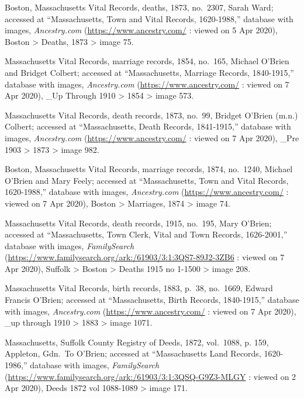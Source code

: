 \begin{thebibliography}{99}
	Boston, Massachusetts Vital Records, deaths, 1873, no.\ 2307, Sarah Ward; accessed at ``Massachusetts, Town and Vital Records, 1620-1988,'' database with images, \textit{Ancestry.com} (\url{https://www.ancestry.com/} : viewed on 5 Apr 2020), Boston > Deaths, 1873 > image 75.
	
	Massachusetts Vital Records, marriage records, 1854, no.\ 165, Michael O'Brien and Bridget Colbert; accessed at ``Massachusetts, Marriage Records, 1840-1915,'' database with images, \textit{Ancestry.com} (\url{https://www.ancestry.com/} : viewed on 7 Apr 2020), \_Up Through 1910 > 1854 > image 573.
	
	Massachusetts Vital Records, death records, 1873, no.\ 99, Bridget O'Brien (m.n.) Colbert; accessed at ``Massachusetts, Death Records, 1841-1915,'' database with images, \textit{Ancestry.com} (\url{https://www.ancestry.com/} : viewed on 7 Apr 2020), \_Pre 1903 > 1873 > image 982.
	
	Boston, Massachusetts Vital Records, marriage records, 1874, no.\ 1240, Michael O'Brien and Mary Feely; accessed at ``Massachusetts, Town and Vital Records, 1620-1988,'' database with images, \textit{Ancestry.com} (\url{https://www.ancestry.com/} : viewed on 7 Apr 2020), Boston > Marriages, 1874 > image 74.
	
	Massachusetts Vital Records, death records, 1915, no.\ 195, Mary O'Brien; accessed at ``Massachusetts, Town Clerk, Vital and Town Records, 1626-2001,'' database with images, \textit{FamilySearch} (\url{https://www.familysearch.org/ark:/61903/3:1:3QS7-89J2-3ZB6} : viewed on 7 Apr 2020), Suffolk > Boston > Deaths 1915 no 1-1500 > image 208.
	
	Massachusetts Vital Records, birth records, 1883, p.\ 38, no.\ 1669, Edward Francis O'Brien; accessed at ``Massachusetts, Birth Records, 1840-1915,'' database with images, \textit{Ancestry.com} (\url{https://www.ancestry.com/} : viewed on 7 Apr 2020), \_up through 1910 > 1883 > image 1071.
	
	Massachusetts, Suffolk County Registry of Deeds, 1872, vol.\ 1088, p. 159, Appleton, Gdn.\ To O’Brien; accessed at ``Massachusetts Land Records, 1620-1986,'' database with images, \textit{FamilySearch} (\url{https://www.familysearch.org/ark:/61903/3:1:3QSQ-G9Z3-MLGY} : viewed on 2 Apr 2020), Deeds 1872 vol 1088-1089 > image 171.
	

\end{thebibliography}
